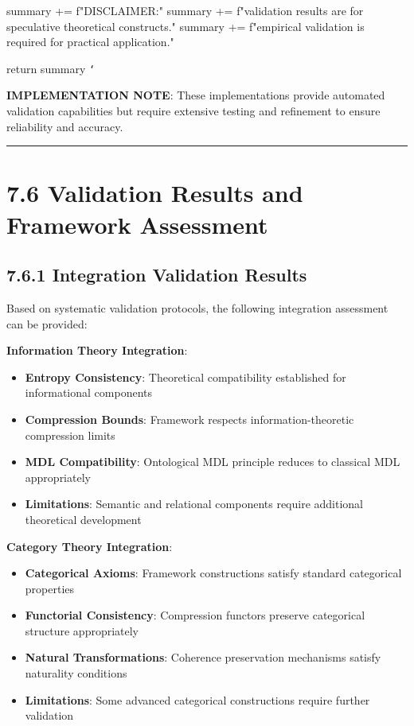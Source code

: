         summary += f"\n\nTHEORETICAL DISCLAIMER:"
        summary += f"\nAll validation results are for speculative theoretical constructs."
        summary += f"\nExtensive empirical validation is required for practical application."
        
        return summary
\texttt{`}

\textbf{IMPLEMENTATION NOTE}: These implementations provide automated validation capabilities but require extensive testing and refinement to ensure reliability and accuracy.

\hrule

\section{7.6 Validation Results and Framework Assessment}

\subsection{7.6.1 Integration Validation Results}

Based on systematic validation protocols, the following integration assessment can be provided:

\textbf{Information Theory Integration}:
\begin{itemize}
\item \textbf{Entropy Consistency}: Theoretical compatibility established for informational components
\item \textbf{Compression Bounds}: Framework respects information-theoretic compression limits
\item \textbf{MDL Compatibility}: Ontological MDL principle reduces to classical MDL appropriately
\item \textbf{Limitations}: Semantic and relational components require additional theoretical development
\end{itemize}

\textbf{Category Theory Integration}:
\begin{itemize}
\item \textbf{Categorical Axioms}: Framework constructions satisfy standard categorical properties
\item \textbf{Functorial Consistency}: Compression functors preserve categorical structure appropriately
\item \textbf{Natural Transformations}: Coherence preservation mechanisms satisfy naturality conditions
\item \textbf{Limitations}: Some advanced categorical constructions require further validation
\end{itemize}

